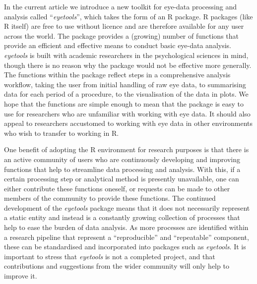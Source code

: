 \documentclass[
  man,
  floatsintext,
  longtable,
  nolmodern,
  notxfonts,
  notimes,
  colorlinks=true,linkcolor=blue,citecolor=blue,urlcolor=blue]{apa7}
\begin{document}
In the current article we introduce a new toolkit for eye-data
processing and analysis called ``\emph{eyetools}'', which takes the form
of an R package. R packages (like R itself) are free to use without
licence and are therefore available for any user across the world. The
package provides a (growing) number of functions that provide an
efficient and effective means to conduct basic eye-data analysis.
\emph{eyetools} is built with academic researchers in the psychological
sciences in mind, though there is no reason why the package would not be
effective more generally. The functions within the package reflect steps
in a comprehensive analysis workflow, taking the user from initial
handling of raw eye data, to summarising data for each period of a
procedure, to the visualisation of the data in plots. We hope that the
functions are simple enough to mean that the package is easy to use for
researchers who are unfamiliar with working with eye data. It should
also appeal to researchers accustomed to working with eye data in other
environments who wish to transfer to working in R.

One benefit of adopting the R environment for research purposes is that
there is an active community of users who are continuously developing
and improving functions that help to streamline data processing and
analysis. With this, if a certain processing step or analytical method
is presently unavailable, one can either contribute these functions
oneself, or requests can be made to other members of the community to
provide these functions. The continued development of the
\emph{eyetools} package means that it does not necessarily represent a
static entity and instead is a constantly growing collection of
processes that help to ease the burden of data analysis. As more
processes are identified within a research pipeline that represent a
``reproducible'' and ``repeatable'' component, these can be standardised
and incorporated into packages such as \emph{eyetools}. It is important
to stress that \emph{eyetools} is not a completed project, and that
contributions and suggestions from the wider community will only help to
improve it.
\end{document}
